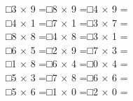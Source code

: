 \documentclass[uplatex,
paper=a4,
fontsize=18pt,
jafontsize=16pt,
number_of_lines=30,
line_length=30zh,
baselineskip=25pt,
]{jlreq}
\begin{document}
□\hspace{1em}3 × 9 =\hspace{3em}□\hspace{1em}8 × 9 =\hspace{3em}□\hspace{1em}4 × 9 =\hspace{3em}
\\

□\hspace{1em}4 × 1 =\hspace{3em}□\hspace{1em}7 × 1 =\hspace{3em}□\hspace{1em}3 × 7 =\hspace{3em}
\\

□\hspace{1em}8 × 8 =\hspace{3em}□\hspace{1em}4 × 8 =\hspace{3em}□\hspace{1em}3 × 1 =\hspace{3em}
\\

□\hspace{1em}6 × 5 =\hspace{3em}□\hspace{1em}2 × 9 =\hspace{3em}□\hspace{1em}7 × 3 =\hspace{3em}
\\

□\hspace{1em}1 × 8 =\hspace{3em}□\hspace{1em}6 × 4 =\hspace{3em}□\hspace{1em}0 × 4 =\hspace{3em}
\\

□\hspace{1em}5 × 3 =\hspace{3em}□\hspace{1em}7 × 8 =\hspace{3em}□\hspace{1em}6 × 6 =\hspace{3em}
\\

□\hspace{1em}5 × 6 =\hspace{3em}□\hspace{1em}1 × 0 =\hspace{3em}□\hspace{1em}2 × 0 =\hspace{3em}
\\
\end{document}
